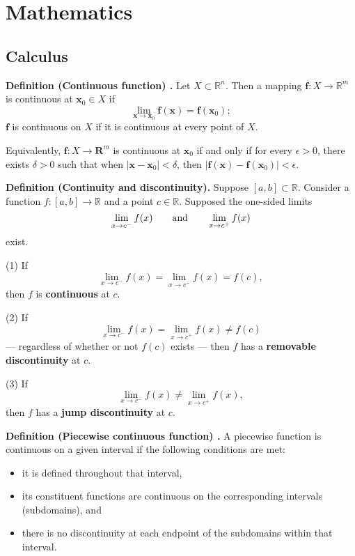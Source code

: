 \chapter{Mathematics}
\section{Calculus}

\begin{shaded}
\textbf{Definition (Continuous function) \cite{hubbard_hubbard}.} Let $X \subset \mathbb{R}^n$. Then a mapping $\mathbf{f} : X \to \mathbb{R}^m$ is continuous at $\mathbf{x}_0 \in X$ if
$$ \lim_{\mathbf{x} \to \mathbf{x}_0} \mathbf{f}(\mathbf{x}) = \mathbf{f}(\mathbf{x}_0); $$
$\mathbf{f}$ is continuous on $X$ if it is continuous at every point of $X$.

Equivalently, $\mathbf{f}: X \to \mathbf{R}^m$ is continuous at $\mathbf{x}_0$ if and only if for every $\epsilon > 0$, there exists $\delta > 0$ such that when $|\mathbf{x} - \mathbf{x}_0| < \delta$, then $|\mathbf{f}(\mathbf{x}) - \mathbf{f}(\mathbf{x}_0)| < \epsilon$.
\end{shaded}

\begin{shaded}
\textbf{Definition (Continuity and discontinuity).} Suppose $[a, b] \subset \mathbb{R}$. Consider a function $f : [a, b] \to \mathbb{R}$ and a point $c \in \mathbb{R}$. Supposed the one-sided limits
$$ \lim_{x \to c^-} f(x) \qquad \textnormal{and} \qquad \lim_{x \to c^+} f(x) $$
exist.

(1) If
$$ \lim_{x \to c^-} f(x) = \lim_{x \to c^+} f(x) = f(c) , $$
then $f$ is \textbf{continuous} at $c$.

(2) If
$$ \lim_{x \to c^-} f(x) = \lim_{x \to c^+} f(x) \not= f(c) $$
--- regardless of whether or not $f(c)$ exists --- then $f$ has a \textbf{removable discontinuity} at $c$.

(3) If
$$ \lim_{x \to c^-} f(x) \not= \lim_{x \to c^+} f(x) , $$
then $f$ has a \textbf{jump discontinuity} at $c$.
\end{shaded}

\begin{shaded}
\textbf{Definition (Piecewise continuous function) \cite{wikipedia_piecewise}.} A piecewise function is continuous on a given interval if the following conditions are met:
\begin{itemize}
	\item it is defined throughout that interval,
	\item its constituent functions are continuous on the corresponding intervals (subdomains), and
	\item there is no discontinuity at each endpoint of the subdomains within that interval.
\end{itemize}
\end{shaded}